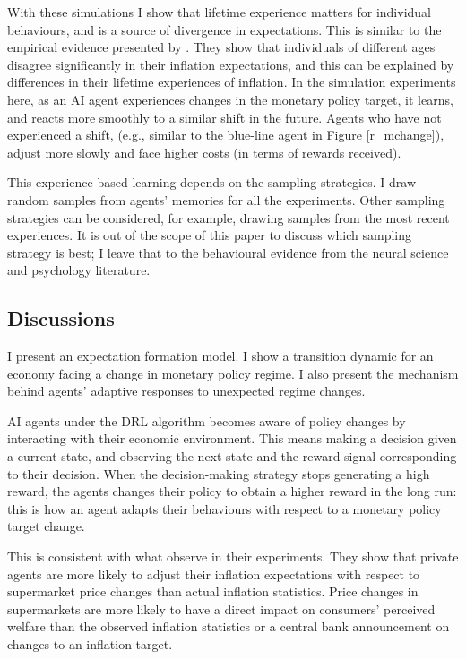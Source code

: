 \documentclass[hidelinks]{article}
\begin{document}
With these simulations I show that lifetime experience matters for individual behaviours, and is a source of divergence in expectations. This is similar to the empirical evidence presented by \cite{MalmendierNagel2016}. They show that individuals of different ages disagree significantly in their inflation expectations, and this can be explained by differences in their lifetime experiences of inflation. In the simulation experiments here, as an AI agent experiences changes in the monetary policy target, it learns, and reacts more smoothly to a similar shift in the future. Agents who have not experienced a  shift, (e.g., similar to the blue-line agent in Figure \ref{r_mchange}), adjust more slowly and face higher costs (in terms of rewards received).

This experience-based learning depends on the sampling strategies. I draw random samples from agents' memories for all the experiments. Other sampling strategies can be considered, for example, drawing samples from the most recent experiences. It is out of the scope of this paper to discuss which sampling strategy is best; I leave that to the behavioural evidence from the neural science and psychology literature. 




\subsection{Discussions}


I present an expectation formation model. I show a transition dynamic for an economy facing a change in monetary policy regime. I also present the mechanism behind agents' adaptive responses to unexpected regime changes.

AI agents under the DRL algorithm becomes aware of policy changes by interacting with their economic environment. This means making a decision given a current state, and observing the next state and the reward signal corresponding to their decision. When the decision-making strategy stops generating a high reward, the agents changes their policy to obtain a higher reward in the long run: this is how an agent adapts their behaviours with respect to a monetary policy target change. 

This is consistent with what \cite{Cavalloetal2017} observe in their experiments. They show that private agents are more likely to adjust their inflation expectations with respect to supermarket price changes than actual inflation statistics. Price changes in supermarkets are more likely to have a direct impact on consumers' perceived welfare than the observed inflation statistics or a central bank announcement on changes to an inflation target. 
\end{document}
